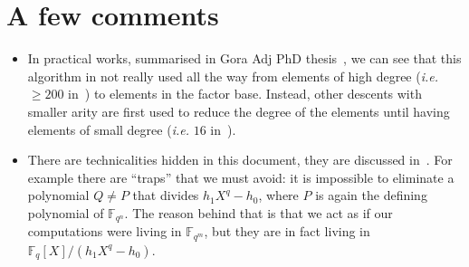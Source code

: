 \documentclass[a4paper,11pt]{article}
\theoremstyle{break}
\theoremstyle{sc}
\theoremstyle{definition}
\theoremstyle{remark}
\newcommand{\ie}{\emph{i.e. }}
\begin{document}
\section{A few comments}

\begin{itemize}
  \item In practical works, summarised in Gora Adj PhD thesis~\cite{Adj16}, we
    can see that this algorithm in not really used all the way from elements
    of high degree (\ie $\geq 200$ in~\cite{Adj16}) to elements in the factor base. Instead, other descents
    with smaller arity are first used to reduce the degree of the elements
    until having elements of small degree (\ie $16$ in~\cite{Adj16}).
  \item There are technicalities hidden in this document, they are discussed
    in~\cite{GKZ14}. For example there are ``traps'' that we must avoid: it is
    impossible to eliminate a polynomial $Q\neq P$ that divides
    $h_1X^q-h_0$, where $P$ is again the defining polynomial of
    $\mathbb{F}_{q^n}$. The reason behind that is that we act as if our
    computations were living in $\mathbb{F}_{q^m}$, but they are in fact living
    in $\mathbb{F}_{q}[X]/(h_1X^q-h_0)$.
\end{itemize}

\clearpage


\end{document}
